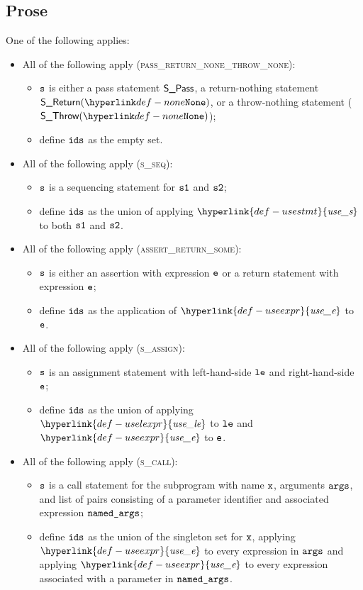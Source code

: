 \documentclass{book}
\newcommand\useexpr[0]{\hyperlink{def-useexpr}{\textfunc{use\_e}}}
\newcommand\uselexpr[0]{\hyperlink{def-uselexpr}{\textfunc{use\_le}}}
\newcommand\usestmt[0]{\hyperlink{def-usestmt}{\textfunc{use\_s}}}
\begin{document}
\subsection{Prose}
One of the following applies:
\begin{itemize}
  \item All of the following apply (\textsc{pass\_return\_none\_throw\_none}):
  \begin{itemize}
    \item $\texttt{s}$ is either a pass statement $\textsf{S\_Pass}$, a return-nothing statement $\SReturn(\None)$,
          or a throw-nothing statement ($\SThrow(\None)$);
    \item define $\texttt{ids}$ as the empty set.
  \end{itemize}

  \item All of the following apply (\textsc{s\_seq}):
  \begin{itemize}
    \item $\texttt{s}$ is a sequencing statement for $\texttt{s1}$ and $\texttt{s2}$;
    \item define $\texttt{ids}$ as the union of applying $\usestmt$ to both $\texttt{s1}$ and $\texttt{s2}$.
  \end{itemize}

  \item All of the following apply (\textsc{assert\_return\_some}):
  \begin{itemize}
    \item $\texttt{s}$ is either an assertion with expression $\texttt{e}$ or a return statement with expression $\texttt{e}$;
    \item define $\texttt{ids}$ as the application of $\useexpr$ to $\texttt{e}$.
  \end{itemize}

  \item All of the following apply (\textsc{s\_assign}):
  \begin{itemize}
    \item $\texttt{s}$ is an assignment statement with left-hand-side $\texttt{le}$ and right-hand-side $\texttt{e}$;
    \item define $\texttt{ids}$ as the union of applying $\uselexpr$ to $\texttt{le}$ and $\useexpr$ to $\texttt{e}$.
  \end{itemize}

  \item All of the following apply (\textsc{s\_call}):
  \begin{itemize}
    \item $\texttt{s}$ is a call statement for the subprogram with name $\texttt{x}$, arguments $\texttt{args}$, and list of
          pairs consisting of a parameter identifier and associated expression $\texttt{named\_args}$;
    \item define $\texttt{ids}$ as the union of the singleton set for $\texttt{x}$, applying $\useexpr$ to
          every expression in $\texttt{args}$ and applying $\useexpr$ to every expression associated with
          a parameter in $\texttt{named\_args}$.
  \end{itemize}


\end{itemize}
\end{document}
